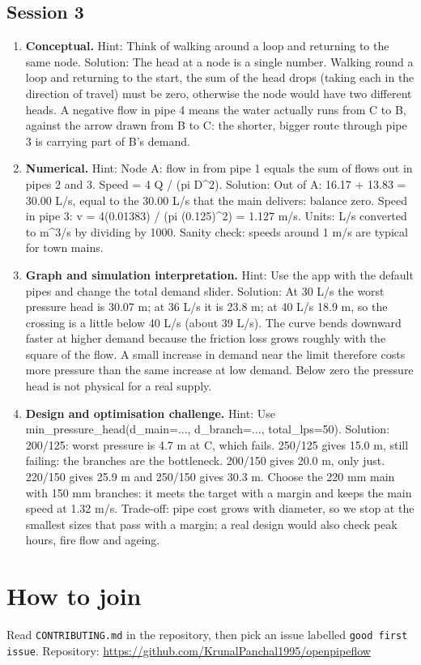 \documentclass[11pt,a4paper]{article}
\begin{document}
\subsection*{Session 3}
\begin{enumerate}[nosep]
\item \textbf{Conceptual.} Hint: Think of walking around a loop and returning to the same node. Solution: The head at a node is a single number. Walking round a loop and returning to the start, the sum of the head drops (taking each in the direction of travel) must be zero, otherwise the node would have two different heads. A negative flow in pipe 4 means the water actually runs from C to B, against the arrow drawn from B to C: the shorter, bigger route through pipe 3 is carrying part of B's demand.
\item \textbf{Numerical.} Hint: Node A: flow in from pipe 1 equals the sum of flows out in pipes 2 and 3. Speed = 4 Q / (pi D\textasciicircum{}2). Solution: Out of A: 16.17 + 13.83 = 30.00 L/s, equal to the 30.00 L/s that the main delivers: balance zero. Speed in pipe 3: v = 4(0.01383) / (pi (0.125)\textasciicircum{}2) = 1.127 m/s. Units: L/s converted to m\textasciicircum{}3/s by dividing by 1000. Sanity check: speeds around 1 m/s are typical for town mains.
\item \textbf{Graph and simulation interpretation.} Hint: Use the app with the default pipes and change the total demand slider. Solution: At 30 L/s the worst pressure head is 30.07 m; at 36 L/s it is 23.8 m; at 40 L/s 18.9 m, so the crossing is a little below 40 L/s (about 39 L/s). The curve bends downward faster at higher demand because the friction loss grows roughly with the square of the flow. A small increase in demand near the limit therefore costs more pressure than the same increase at low demand. Below zero the pressure head is not physical for a real supply.
\item \textbf{Design and optimisation challenge.} Hint: Use min\_pressure\_head(d\_main=..., d\_branch=..., total\_lps=50). Solution: 200/125: worst pressure is 4.7 m at C, which fails. 250/125 gives 15.0 m, still failing: the branches are the bottleneck. 200/150 gives 20.0 m, only just. 220/150 gives 25.9 m and 250/150 gives 30.3 m. Choose the 220 mm main with 150 mm branches: it meets the target with a margin and keeps the main speed at 1.32 m/s. Trade-off: pipe cost grows with diameter, so we stop at the smallest sizes that pass with a margin; a real design would also check peak hours, fire flow and ageing.
\end{enumerate}

\section{How to join}
Read \texttt{CONTRIBUTING.md} in the repository, then pick an issue labelled \texttt{good first issue}. Repository: \url{https://github.com/KrunalPanchal1995/openpipeflow}
\end{document}
